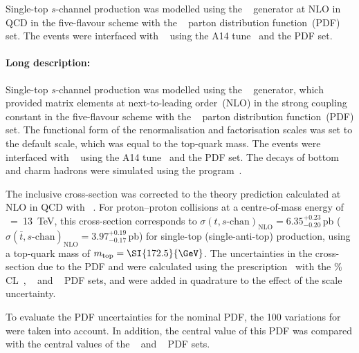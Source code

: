 Single-top $s$-channel production was modelled using the \POWHEGBOX[v2]~\cite{Alioli:2009je,Nason:2004rx,Frixione:2007vw,Alioli:2010xd}
generator at NLO in QCD in the five-flavour scheme with the \NNPDF[3.0nlo]~\cite{Ball:2014uwa} parton distribution function~(PDF) set.
The events were interfaced with \PYTHIA[8.230]~\cite{Sjostrand:2014zea} using the A14 tune~\cite{ATL-PHYS-PUB-2014-021} and the
\NNPDF[2.3lo] PDF set.




\paragraph{Long description:}

Single-top $s$-channel production was modelled using the \POWHEGBOX[v2]~\cite{Alioli:2009je,Nason:2004rx,Frixione:2007vw,Alioli:2010xd}
generator, which provided matrix elements at next-to-leading order~(NLO) in the strong coupling constant \alphas in the 
five-flavour scheme with the \NNPDF[3.0nlo]~\cite{Ball:2014uwa} parton distribution function~(PDF) set.
The functional form of the renormalisation and factorisation scales was set to the default scale, which was equal to the top-quark mass.
The events were interfaced with \PYTHIA[8.230]~\cite{Sjostrand:2014zea} using the A14 tune~\cite{ATL-PHYS-PUB-2014-021} and the
\NNPDF[2.3lo] PDF set.
The decays of bottom and charm hadrons were simulated using the \EVTGEN[1.6.0] program~\cite{Lange:2001uf}.

The inclusive cross-section was corrected to the theory prediction calculated at NLO in QCD with 
\HATHOR[2.1]~\cite{Aliev:2010zk,Kant:2014oha}.
For proton--proton collisions at a centre-of-mass energy of \rts~=~\SI{13}{\TeV}, this cross-section corresponds to
$\sigma(t,s\text{-chan})_\text{NLO}= 6.35^{+0.23}_{-0.20}$\,pb ($\sigma(\bar{t},s\text{-chan})_\text{NLO}=3.97^{+0.19}_{-0.17}$\,pb)
for single-top (single-anti-top) production, using a top-quark mass of $\mtop = \SI{172.5}{\GeV}$.
The uncertainties in the cross-section due to the PDF and \alphas were calculated using the \PDFforLHC prescription~\cite{Butterworth:2015oua}
with the \% CL~\cite{Martin:2009iq,Martin:2009bu}, \CT[10nlo]~\cite{Lai:2010vv} and \NNPDF[2.3nlo]~\cite{Ball:2012cx} PDF sets,
and were added in quadrature to the effect of the scale uncertainty.



To evaluate the PDF uncertainties for the nominal PDF, the 100 variations for \NNPDF[3.0nlo] were taken into account. 
In addition, the central value of this PDF was compared with the central values of the 
\CT[14nnlo]~\cite{Dulat:2015mca} and \MMHT[nnlo]~\cite{Harland-Lang:2014zoa} PDF sets.


